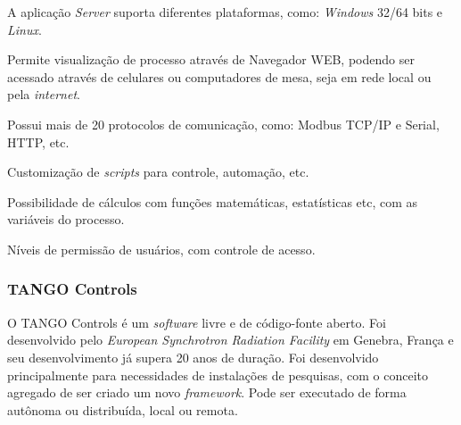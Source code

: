     \begin{alineascomponto}
	    \item A aplicação \textit{Server} suporta diferentes plataformas, como: \textit{Windows} 32/64 bits e \textit{Linux}.
	    \item Permite visualização de processo através de Navegador \gls{WEB}, podendo ser acessado através de celulares ou computadores de mesa, seja em rede local ou pela \textit{internet}.
    	\item Possui mais de 20 protocolos de comunicação, como: Modbus \gls{TCP/IP} e Serial, \gls{HTTP}, etc.
    	\item Customização de \textit{scripts} para controle, automação, etc.
    	\item Possibilidade de cálculos com funções matemáticas, estatísticas etc, com as variáveis do processo.
    	\item Níveis de permissão de usuários, com controle de acesso.
    \end{alineascomponto}
    
\subsubsection{TANGO Controls}
\label{sec:tango}

    O TANGO Controls \cite{Tango} é um \textit{software} livre e de código-fonte aberto. Foi desenvolvido pelo \textit{European Synchrotron Radiation Facility} em Genebra, França e seu desenvolvimento já supera 20 anos de duração. Foi desenvolvido principalmente para necessidades de instalações de pesquisas, com o conceito agregado de ser criado um novo \textit{framework}. Pode ser executado de forma autônoma ou distribuída, local ou remota.

    \begin{figure}[!h]
    \end{figure}
    
